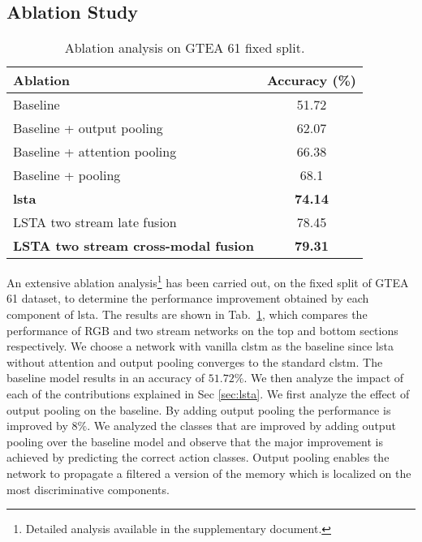 \documentclass[10pt,twocolumn,letterpaper]{article}
\begin{document}
	\subsection{Ablation Study}
	\begin{table}[t]\small
	\centering
	\begin{tabular}{|l|c|}
		\hline
		Ablation & Accuracy (\%) \\ \hline \hline
		Baseline & 51.72 \\ \hline
		Baseline + output pooling & 62.07\\ \hline
		Baseline + attention pooling & 66.38 \\ \hline
		Baseline + pooling & 68.1 \\ \hline
		\textbf{\ac{lsta}} & \textbf{74.14} \\ \hline \hline
		LSTA two stream late fusion  & 78.45 \\ \hline
		\textbf{LSTA two stream cross-modal fusion} & \textbf{79.31} \\ \hline
\end{tabular}
	\vspace{-0.2cm}
	\caption{Ablation analysis on GTEA 61 fixed split.}
	\label{tab:ablation}\vspace{-0.3cm}
\end{table}



An extensive ablation analysis\footnote{Detailed analysis available in the supplementary document.} has been carried out, on the fixed split of GTEA 61 dataset, to determine the performance improvement obtained by each component of \ac{lsta}.
The results are shown in Tab.~\ref{tab:ablation},
which compares the performance of RGB and two stream networks on the top and bottom sections respectively.
We choose a network with vanilla \ac{clstm} as the baseline since \ac{lsta} without attention and output pooling converges to the standard \ac{clstm}. The baseline model results in an accuracy of $51.72\%$. We then analyze the impact of each of the contributions explained in Sec \ref{sec:lsta}. We first analyze the effect of output pooling on the baseline. By adding output pooling the performance is improved by $8\%$. We analyzed the classes that are improved by adding output pooling over the baseline model and observe that the major improvement is achieved by predicting the correct action classes. Output pooling enables the network to propagate a filtered a version of the memory which is localized on the most discriminative components.
\end{document}
